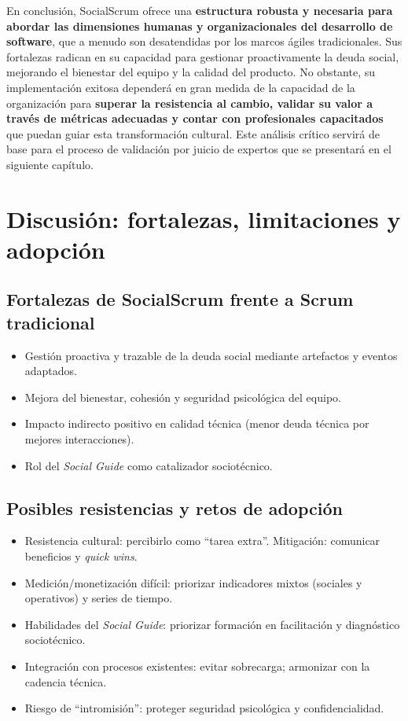 En conclusión, SocialScrum ofrece una \textbf{estructura robusta y necesaria para abordar las dimensiones humanas y organizacionales del desarrollo de software}, que a menudo son desatendidas por los marcos ágiles tradicionales. Sus fortalezas radican en su capacidad para gestionar proactivamente la deuda social, mejorando el bienestar del equipo y la calidad del producto. No obstante, su implementación exitosa dependerá en gran medida de la capacidad de la organización para \textbf{superar la resistencia al cambio, validar su valor a través de métricas adecuadas y contar con profesionales capacitados} que puedan guiar esta transformación cultural. Este análisis crítico servirá de base para el proceso de validación por juicio de expertos que se presentará en el siguiente capítulo.

\section{Discusión: fortalezas, limitaciones y adopción}
\label{sec:discusion}

\subsection{Fortalezas de SocialScrum frente a Scrum tradicional}
\begin{itemize}[leftmargin=*,nosep]
  \item Gestión proactiva y trazable de la deuda social mediante artefactos y eventos adaptados.
  \item Mejora del bienestar, cohesión y seguridad psicológica del equipo.
  \item Impacto indirecto positivo en calidad técnica (menor deuda técnica por mejores interacciones).
  \item Rol del \textit{Social Guide} como catalizador sociotécnico.
\end{itemize}

\subsection{Posibles resistencias y retos de adopción}
\begin{itemize}[leftmargin=*,nosep]
  \item Resistencia cultural: percibirlo como ``tarea extra''. Mitigación: comunicar beneficios y \textit{quick wins}.
  \item Medición/monetización difícil: priorizar indicadores mixtos (sociales y operativos) y series de tiempo.
  \item Habilidades del \textit{Social Guide}: priorizar formación en facilitación y diagnóstico sociotécnico.
  \item Integración con procesos existentes: evitar sobrecarga; armonizar con la cadencia técnica.
  \item Riesgo de ``intromisión'': proteger seguridad psicológica y confidencialidad.
\end{itemize}

